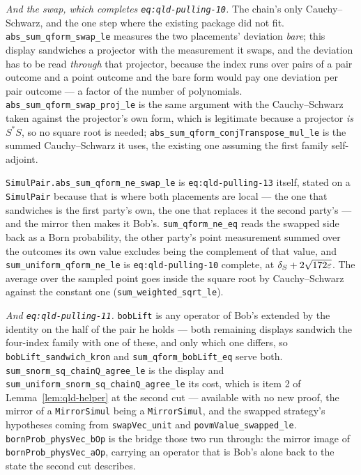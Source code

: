 \emph{And the swap, which completes \texttt{eq:qld-pulling-10}.} The chain's only
Cauchy--Schwarz, and the one step where the existing package did not fit.
\texttt{abs\_sum\_qform\_swap\_le} measures the two placements' deviation \emph{bare}; this
display sandwiches a projector with the measurement it swaps, and the deviation has to be read
\emph{through} that projector, because the index runs over pairs of a pair outcome and a point
outcome and the bare form would pay one deviation per pair outcome --- a factor of the number of
polynomials. \texttt{abs\_sum\_qform\_swap\_proj\_le} is the same argument with the
Cauchy--Schwarz taken against the projector's own form, which is legitimate because a projector
\emph{is} $S^*S$, so no square root is needed;
\texttt{abs\_sum\_qform\_conjTranspose\_mul\_le} is the summed Cauchy--Schwarz it uses, the
existing one assuming the first family self-adjoint.

\texttt{SimulPair.abs\_sum\_qform\_ne\_swap\_le} is \texttt{eq:qld-pulling-13} itself,
stated on a \texttt{SimulPair} because that is where both placements are local --- the one that
sandwiches is the first party's own, the one that replaces it the second party's --- and the
mirror then makes it Bob's. \texttt{sum\_qform\_ne\_eq} reads the swapped side back as a Born
probability, the other party's point measurement summed over the outcomes its own value excludes
being the complement of that value, and
\texttt{sum\_uniform\_qform\_ne\_le} is \texttt{eq:qld-pulling-10} complete, at
$\delta_S + 2\sqrt{172\varepsilon}$. The average over the sampled point goes inside the square root by
Cauchy--Schwarz against the constant one (\texttt{sum\_weighted\_sqrt\_le}).

\emph{And \texttt{eq:qld-pulling-11}.} \texttt{bobLift} is any operator of Bob's extended by the
identity on the half of the pair he holds --- both remaining displays sandwich the four-index
family with one of these, and only which one differs, so
\texttt{bobLift\_sandwich\_kron} and \texttt{sum\_qform\_bobLift\_eq} serve both.
\texttt{sum\_snorm\_sq\_chainQ\_agree\_le} is the display and
\texttt{sum\_uniform\_snorm\_sq\_chainQ\_agree\_le} its cost, which is item 2 of
Lemma~\ref{lem:qld-helper} at the second cut --- available with no new proof, the mirror of a
\texttt{MirrorSimul} being a \texttt{MirrorSimul}, and the swapped strategy's hypotheses coming
from \texttt{swapVec\_unit} and \texttt{povmValue\_swapped\_le}.
\texttt{bornProb\_physVec\_bOp} is the bridge those two run through: the mirror image of
\texttt{bornProb\_physVec\_aOp}, carrying an operator that is Bob's alone back to the state the
second cut describes.

